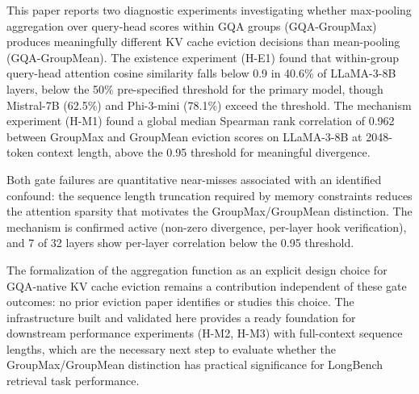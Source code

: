 
This paper reports two diagnostic experiments investigating whether max-pooling aggregation over query-head scores within GQA groups (GQA-GroupMax) produces meaningfully different KV cache eviction decisions than mean-pooling (GQA-GroupMean). The existence experiment (H-E1) found that within-group query-head attention cosine similarity falls below 0.9 in 40.6\% of LLaMA-3-8B layers, below the 50\% pre-specified threshold for the primary model, though Mistral-7B (62.5\%) and Phi-3-mini (78.1\%) exceed the threshold. The mechanism experiment (H-M1) found a global median Spearman rank correlation of 0.962 between GroupMax and GroupMean eviction scores on LLaMA-3-8B at 2048-token context length, above the 0.95 threshold for meaningful divergence.

Both gate failures are quantitative near-misses associated with an identified confound: the sequence length truncation required by memory constraints reduces the attention sparsity that motivates the GroupMax/GroupMean distinction. The mechanism is confirmed active (non-zero divergence, per-layer hook verification), and 7 of 32 layers show per-layer correlation below the 0.95 threshold.

The formalization of the aggregation function as an explicit design choice for GQA-native KV cache eviction remains a contribution independent of these gate outcomes: no prior eviction paper identifies or studies this choice. The infrastructure built and validated here provides a ready foundation for downstream performance experiments (H-M2, H-M3) with full-context sequence lengths, which are the necessary next step to evaluate whether the GroupMax/GroupMean distinction has practical significance for LongBench retrieval task performance.

